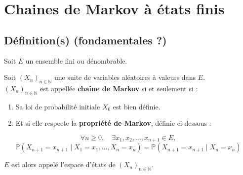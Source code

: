 \documentclass{article}
\begin{document}
\newpage

\section{Chaines de Markov à états finis}

\subsection{Définition(s) (fondamentales ?)}


Soit $E$ un ensemble fini ou dénombrable.

Soit $(X_n)_{n \in \mathbb{N}}$ une suite de variables aléatoires à valeurs dans $E$. \\

$(X_n)_{n \in \mathbb{N}}$ est appellée \textbf{chaîne de Markov} si et seulement si :
\begin{enumerate}[leftmargin=5em, label=(\arabic*)]
  \item Sa loi de probabilité initiale $X_0$ est bien définie.
  \item Et si elle respecte la \textbf{propriété de Markov}, définie ci-dessous :
\end{enumerate}
\[
\forall n \geq 0, \quad \exists x_1, x_2, \dots, x_{n+1} \in E,
\]
\[
\mathbb{P}(X_{n+1} = x_{n+1} \mid X_1 = x_1, \dots, X_n = x_n) = \mathbb{P}(X_{n+1} = x_{n+1} \mid X_n = x_n)
\]

\medskip
$E$ est alors appelé l'espace d'états de $(X_n)_{n \in \mathbb{N}}$. \\ \\
\end{document}

